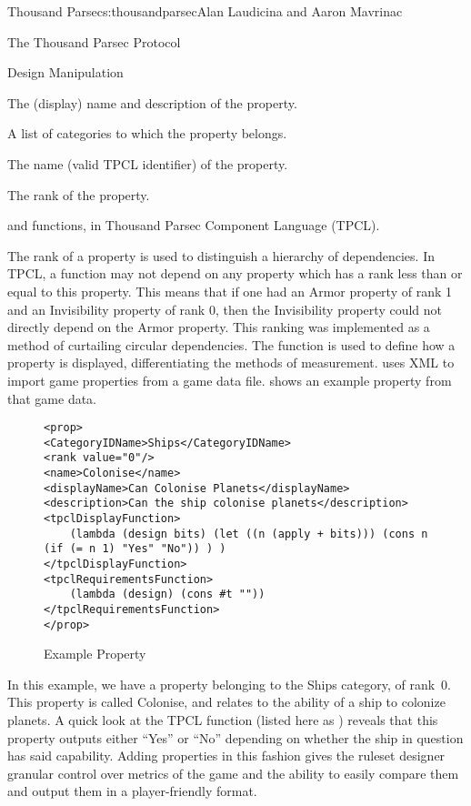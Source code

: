 \begin{aosachapter}{Thousand Parsec}{s:thousandparsec}{Alan Laudicina and Aaron Mavrinac}
\begin{aosasect1}{The Thousand Parsec Protocol}
\begin{aosasect2}{Design Manipulation}
\begin{aosaitemize}

  \item The (display) name and description of the property.

  \item A list of categories to which the property belongs.

  \item The name (valid TPCL identifier) of the property.

  \item The rank of the property.

  \item {} and  functions, in Thousand Parsec Component Language (TPCL).

\end{aosaitemize}

The rank of a property is used to distinguish a hierarchy of
dependencies. In TPCL, a function may not depend on any property which
has a rank less than or equal to this property. This means that if one
had an Armor property of rank 1 and an Invisibility property of rank
0, then the Invisibility property could not directly depend on the
Armor property. This ranking was implemented as a method of curtailing
circular dependencies. The  function is used to define
how a property is displayed, differentiating the methods of
measurement.  uses XML to import game
properties from a game data file.  shows an
example property from that game data.

\begin{figure}
\begin{verbatim}
<prop>
<CategoryIDName>Ships</CategoryIDName>
<rank value="0"/>
<name>Colonise</name>
<displayName>Can Colonise Planets</displayName>
<description>Can the ship colonise planets</description>
<tpclDisplayFunction>
    (lambda (design bits) (let ((n (apply + bits))) (cons n (if (= n 1) "Yes" "No")) ) )
</tpclDisplayFunction>
<tpclRequirementsFunction>
    (lambda (design) (cons #t ""))
</tpclRequirementsFunction>
</prop>
\end{verbatim}
\caption{Example Property}
\label{fig.tp.prop}
\end{figure}

In this example, we have a property belonging to the Ships category,
of rank~0. This property is called Colonise, and relates to the
ability of a ship to colonize planets. A quick look at the TPCL
 function (listed here as )
reveals that this property outputs either ``Yes'' or ``No'' depending
on whether the ship in question has said capability. Adding properties
in this fashion gives the ruleset designer granular control over
metrics of the game and the ability to easily compare them and output
them in a player-friendly format.


\end{aosasect2}
\end{aosasect1}
\end{aosachapter}
